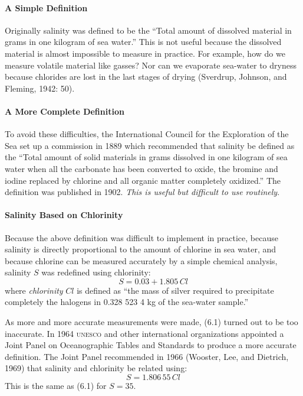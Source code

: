 \paragraph{A Simple Definition} Originally salinity was defined to be the ``Total amount of dissolved material in grams in one kilogram of sea water.'' This is not useful because the dissolved material is almost impossible to measure in practice. For example, how do we measure volatile material like gasses? Nor can we evaporate sea-water to dryness because chlorides are lost in the last stages of drying (Sverdrup, Johnson, and Fleming, 1942: 50).

\paragraph{A More Complete Definition} To avoid these difficulties, the International Council for the Exploration of the Sea set up a commission in 1889 which recommended that salinity be defined as the ``Total amount of solid materials in grams dissolved in one kilogram of sea water when all the carbonate has been converted to oxide, the bromine and iodine replaced by chlorine and all organic matter completely oxidized.'' The definition was published in 1902. \textit{This is useful but difficult to use routinely}.

\paragraph{Salinity Based on Chlorinity} Because the above definition was difficult to implement in practice, because salinity is directly proportional to the amount of chlorine in sea water, and because chlorine can be measured
accurately by a simple chemical analysis, salinity $S$ was redefined using chlorinity:
\begin{equation}
S = 0.03 + 1.805\, Cl
\end{equation}
where \textit{chlorinity} $Cl$ is defined as ``the mass of silver required to precipitate completely the halogens in 0.328 523 4 kg of the sea-water sample.''

As more and more accurate measurements were made, (6.1) turned out to be too inaccurate. In 1964 \textsc{unesco} and other international organizations appointed a Joint Panel on Oceanographic Tables and  Standards to produce a more accurate definition. The Joint Panel recommended in 1966 (Wooster, Lee, and Dietrich, 1969) that salinity and chlorinity be related using:
\begin{equation}
S = 1.806\,55\,Cl
\end{equation}
This is the same as (6.1) for $S=35$.

